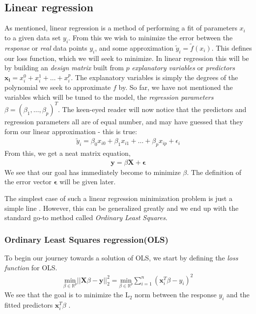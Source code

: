 \documentclass[11pt]{article}
\begin{document}
\subsection{Linear regression}
As mentioned, linear regression is a method of performing a fit of parameters $x_i$ to a given data set $y_i$. From this we wish to minimize the error between the \textit{response} or \textit{real} data points $y_i$, and some approximation $\tilde{y}_i=\tilde{f}(x_i)$. This defines our loss function, which we will seek to minimize. In linear regression this will be by building an \textit{design matrix} built from $p$ \textit{explanatory variables} or \textit{predictors} $\bm{x_i}=x_i^0+x_i^1+\dots+x_i^p$. The explanatory variables is simply the degrees of the polynomial we seek to approximate $f$ by. So far, we have not mentioned the variables which will be tuned to the model, the \textit{regression parameters} $\beta=(\beta_1,\dots,\beta_p)^T$. The keen-eyed reader will now notice that the predictors and regression parameters all are of equal number, and may have guessed that they form our linear approximation - this is true:
\begin{align*}
    \tilde{y}_i = \beta_0 x_{i0} + \beta_1 x_{i1} + \dots + \beta_p x_{ip} + \epsilon_i
\end{align*}
From this, we get a neat matrix equation,
\begin{align}
    \bm{y} = \beta \bm{X} + \bm{\epsilon}
    \label{eq:linreg_eq}
\end{align}
We see that our goal has immediately become to minimize $\beta$. The definition of the error vector $\bm{\epsilon}$ will be given later.

The simplest case of such a linear regression minimization problem is just a simple line \citep[ch. 3.1, p. 61]{james2013introduction}. However, this can be generalized greatly and we end up with the standard go-to method called \textit{Ordinary Least Squares}.

\subsubsection{Ordinary Least Squares regression(OLS)}
To begin our journey towards a solution of OLS, we start by defining the \textit{loss function} for OLS. 
\begin{align}
    \underset{\beta\in \mathbb{R}^{p}}{\text{min}}||\bm{X}\beta - \bm{y}||^2_2 = 
    \underset{\beta\in \mathbb{R}^{p}}{\text{min}}\sum^n_{i=1}\left(\bm{x}^T_i\beta - y_i\right)^2
    \label{eq:ols_constraint}
\end{align}
We see that the goal is to minimize the L$_2$ norm between the response $y_i$ and the fitted predictors $\bm{x}_i^T\beta$ \citep[ch. 4, p. 21]{2018arXiv180308823M}.
\end{document}
